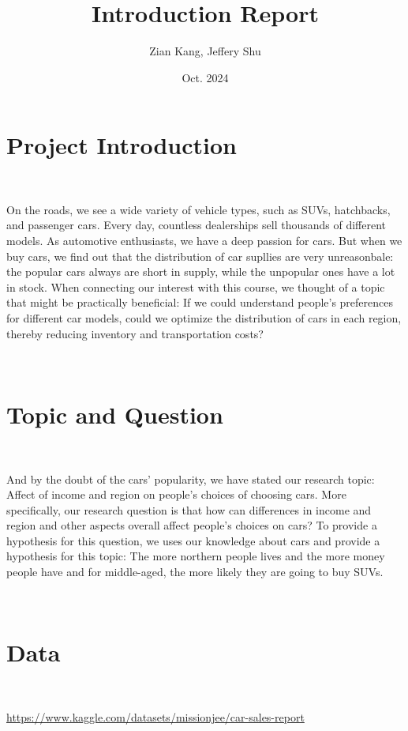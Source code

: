 \documentclass{article}
\author{Zian Kang, Jeffery Shu}
\title{Introduction Report}
\date{Oct. 2024}
\begin{document}
\maketitle

\newpage

\section{Project Introduction}

~

On the roads, we see a wide variety of vehicle types, such as SUVs, hatchbacks, and passenger cars. Every day, countless dealerships sell thousands of different models. As automotive enthusiasts, we have a deep passion for cars. But when we buy cars, we find out that the distribution of car supllies are very unreasonbale: the popular cars always are short in supply, while the unpopular ones have a lot in stock. When connecting our interest with this course, we thought of a topic that might be practically beneficial: If we could understand people's preferences for different car models, could we optimize the distribution of cars in each region, thereby reducing inventory and transportation costs?

~

\section{Topic and Question}

~

And by the doubt of the cars' popularity, we have stated our research topic: Affect of income and region on people's choices of choosing cars. More specifically, our research question is that how can differences in income and region and other aspects overall affect people's choices on cars? To provide a hypothesis for this question, we uses our knowledge about cars and provide a hypothesis for this topic: The more northern people lives and the more money people have and for middle-aged, the more likely they are going to buy SUVs.

~

\section{Data}

~

\url{https://www.kaggle.com/datasets/missionjee/car-sales-report}

~
\end{document}
